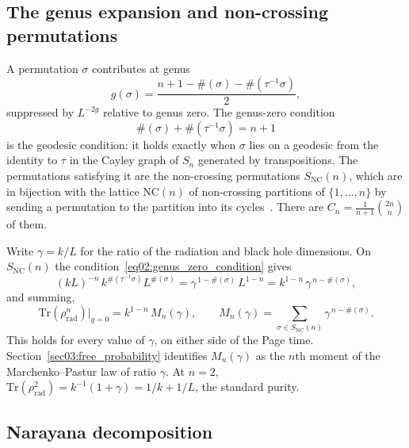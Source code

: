 \documentclass[11pt,letterpaper]{article}
\theoremstyle{plain}
\theoremstyle{definition}
\theoremstyle{remark}
\begin{document}
\subsection{The genus expansion and non-crossing permutations}
\label{subsec02:genus}

A permutation $\sigma$ contributes at genus
\begin{equation}
\label{eq02:genus_formula}
g(\sigma) = \frac{n + 1 - \#(\sigma) - \#(\tau^{-1}\sigma)}{2},
\end{equation}
suppressed by $L^{-2g}$ relative to genus zero. The genus-zero condition
\begin{equation}
\label{eq02:genus_zero_condition}
\#(\sigma) + \#(\tau^{-1}\sigma) = n + 1
\end{equation}
is the geodesic condition: it holds exactly when $\sigma$ lies on a geodesic from the identity to $\tau$ in the Cayley graph of $S_n$ generated by transpositions. The permutations satisfying it are the non-crossing permutations $S_{\mathrm{NC}}(n)$, which are in bijection with the lattice $\mathrm{NC}(n)$ of non-crossing partitions of $\{1, \ldots, n\}$ by sending a permutation to the partition into its cycles~\citep{biane1997, nicaspeicher2006}. There are $C_n = \frac{1}{n+1}\binom{2n}{n}$ of them.

Write $\gamma = k/L$ for the ratio of the radiation and black hole dimensions. On $S_{\mathrm{NC}}(n)$ the condition~\eqref{eq02:genus_zero_condition} gives
\begin{equation}
\label{eq02:contribution_nc}
(kL)^{-n}\, k^{\#(\tau^{-1}\sigma)} L^{\#(\sigma)} = \gamma^{\,1 - \#(\sigma)}\, L^{1-n} = k^{1-n}\, \gamma^{\,n - \#(\sigma)},
\end{equation}
and summing,
\begin{equation}
\label{eq02:trace_genus_zero}
\mathrm{Tr}(\rho_{\mathrm{rad}}^n)\big|_{g=0} = k^{1-n} \, M_n(\gamma), \qquad M_n(\gamma) = \sum_{\sigma \in S_{\mathrm{NC}}(n)} \gamma^{\,n - \#(\sigma)} .
\end{equation}
This holds for every value of $\gamma$, on either side of the Page time. Section~\ref{sec03:free_probability} identifies $M_n(\gamma)$ as the $n$th moment of the Marchenko--Pastur law of ratio $\gamma$. At $n = 2$, $\mathrm{Tr}(\rho_{\mathrm{rad}}^2) = k^{-1}(1+\gamma) = 1/k + 1/L$, the standard purity.

\subsection{Narayana decomposition}
\label{subsec02:narayana}
\end{document}
